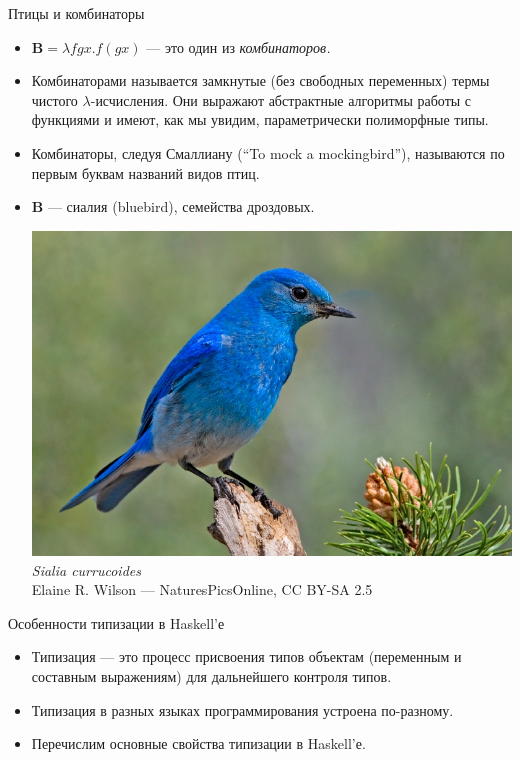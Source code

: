 \documentclass[xcolor=dvipsnames]{beamer}
\newcommand{\Bx}{\mathbf{B}}
\begin{document}
\begin{frame}[fragile]{Птицы и комбинаторы}
 
 
 
 \begin{itemize}[<+->]
  \item $\Bx = \lambda fgx. f(gx)$ --- это один из {\em комбинаторов.} 
  \item Комбинаторами называется замкнутые (без свободных переменных) термы чистого $\lambda$-исчисления. Они выражают абстрактные алгоритмы работы с функциями и имеют, как мы  увидим, параметрически полиморфные типы.
  \item Комбинаторы, следуя Смаллиану (``To mock a mockingbird''), называются по первым буквам названий видов птиц.
  \item $\Bx$ --- сиалия (bluebird), семейства дроздовых.
  \begin{center}
  \vspace*{3pt}
    \includegraphics[scale=.14]{Mountain_Bluebird.jpg}\\ \vspace*{-3pt}
    {\sl Sialia currucoides}\\
    \vspace*{-8pt}
    {\tiny\color{gray}\sf Elaine R. Wilson --- NaturesPicsOnline, CC BY-SA 2.5}
  \end{center}

 \end{itemize}

\end{frame}



\begin{frame}{Особенности типизации в Haskell'е}
 
 \begin{itemize}[<+->]
  \item Типизация --- это процесс присвоения типов объектам (переменным и составным выражениям) для дальнейшего контроля типов.
  \item Типизация в разных языках программирования устроена по-разному.
  \item Перечислим основные свойства типизации в Haskell'е.
 \end{itemize}

 
\end{frame}
\end{document}
